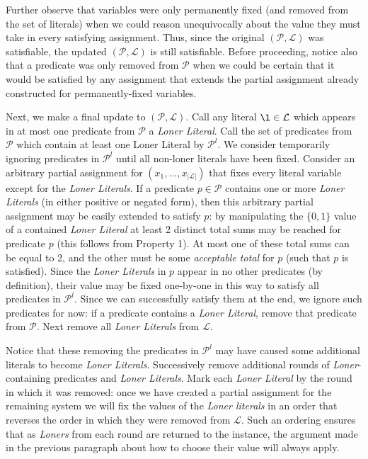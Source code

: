 \documentclass{article}
\begin{document}
Further observe that variables were only permanently fixed (and removed from the set of literals) when we could reason unequivocally about the value they must take in every satisfying assignment. Thus, since the original $(\mathcal{P}, \mathcal{L})$ was satisfiable, the updated $(\mathcal{P}, \mathcal{L})$ is still satisfiable. Before proceeding, notice also that a predicate was only removed from $\mathcal{P}$ when we could be certain that it would be satisfied by any assignment that extends the partial assignment already constructed for permanently-fixed variables.

Next, we make a final update to  $(\mathcal{P}, \mathcal{L})$. Call any literal $\l\in \mathcal{L}$ which appears in at most one predicate from $\mathcal{P}$ a \textit{Loner Literal}. Call the set of predicates from $\mathcal{P}$ which contain at least one Loner Literal by $\mathcal{P}^l$. We consider temporarily ignoring predicates in $\mathcal{P}^l$ until all non-loner literals have been fixed. Consider an arbitrary partial assignment for $(x_1,...,x_{|\mathcal{L}|})$ that fixes every literal variable except for the \textit{Loner Literals}. If a predicate  $p\in \mathcal{P}$ contains one or more \textit{Loner Literals} (in either positive or negated form), then this arbitrary partial assignment may be easily extended to satisfy $p$: by manipulating the $\{0,1\}$ value of a contained \textit{Loner Literal} at least 2 distinct total sums may be reached for predicate $p$ (this follows from Property 1). At most one of these total sums can be equal to 2, and the other must be some \textit{acceptable total} for $p$ (such that $p$ is satisfied). Since the \textit{Loner Literals} in $p$ appear in no other predicates (by definition), their value may be fixed one-by-one in this way to satisfy all predicates in $\mathcal{P}^l$. Since we can successfully satisfy them at the end, we ignore such predicates for now: if a predicate contains a \textit{Loner Literal}, remove that predicate from $\mathcal{P}$. Next remove all \textit{Loner Literals} from $\mathcal{L}$. 

Notice that these removing the predicates in $\mathcal{P}^l$ may have caused some additional literals to become \textit{Loner Literals}. Successively remove additional rounds of \textit{Loner}-containing predicates and \textit{Loner Literals}. Mark each \textit{Loner Literal} by the round in which it was removed: once we have created a partial assignment for the remaining system we will fix the values of the \textit{Loner literals} in an order that reverses the order in which they were removed from $\mathcal{L}$. Such an ordering ensures that as \textit{Loners} from each round are returned to the instance, the argument made in the previous paragraph about how to choose their value will always apply. 
\end{document}

